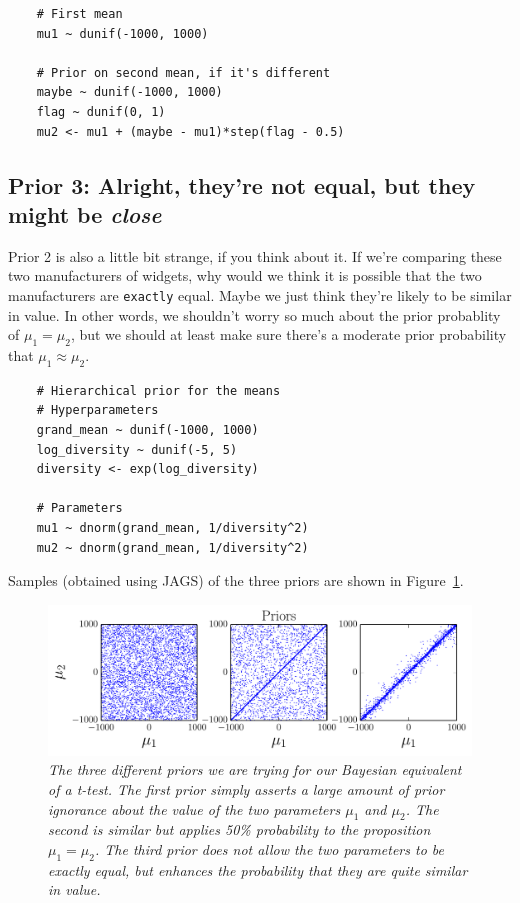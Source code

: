 \begin{framed}
\begin{verbatim}
    # First mean
    mu1 ~ dunif(-1000, 1000)

    # Prior on second mean, if it's different
    maybe ~ dunif(-1000, 1000)
    flag ~ dunif(0, 1)
    mu2 <- mu1 + (maybe - mu1)*step(flag - 0.5)
\end{verbatim}
\end{framed}

\subsection{Prior 3: Alright, they're not equal, but they might be {\it close}}
Prior 2 is also a little bit strange, if you think about it. If we're comparing
these two manufacturers of widgets, why would we think it is possible that the
two manufacturers are {\tt exactly} equal. Maybe we just think they're likely
to be similar in value. In other words, we shouldn't worry so much about the
prior probablity of $\mu_1 = \mu_2$, but we should at least make sure there's
a moderate prior probability that $\mu_1 \approx \mu_2$.

\begin{framed}
\begin{verbatim}
    # Hierarchical prior for the means
    # Hyperparameters
    grand_mean ~ dunif(-1000, 1000)
    log_diversity ~ dunif(-5, 5)
    diversity <- exp(log_diversity)

    # Parameters
    mu1 ~ dnorm(grand_mean, 1/diversity^2)
    mu2 ~ dnorm(grand_mean, 1/diversity^2)
\end{verbatim}
\end{framed}


Samples (obtained using JAGS) of the three priors are shown in
Figure~\ref{fig:ttest1}.
\begin{figure}[h]
\begin{center}
\includegraphics[scale=0.8]{Figures/ttest1.pdf}
\caption{\it The three different priors we are trying for our Bayesian
equivalent of a t-test. The first prior simply asserts a large amount of
prior ignorance about the value of the two parameters $\mu_1$ and $\mu_2$.
The second is similar but applies 50\% probability to the proposition
$\mu_1 = \mu_2$. The third prior does not allow the two parameters to be
exactly equal, but enhances the probability that they are quite similar
in value.\label{fig:ttest1}}
\end{center}
\end{figure}


